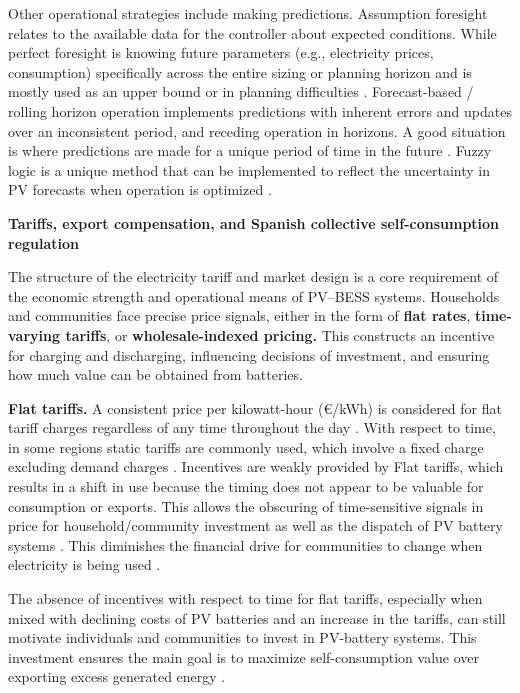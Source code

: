 Other operational strategies include making predictions. Assumption foresight relates to the available data for the controller about expected conditions. While perfect foresight is
knowing future parameters (e.g., electricity prices, consumption)
specifically across the entire sizing or planning horizon and is mostly
used as an upper bound or in planning difficulties \cite{ch2ref049}.
Forecast-based / rolling horizon operation implements predictions with
inherent errors and updates over an inconsistent period, and receding
operation in horizons. A good situation is where predictions are made
for a unique period of time in the future \cite{ch2ref049}. Fuzzy logic is a
unique method that can be implemented to reflect the uncertainty in PV
forecasts when operation is optimized \cite{ch2ref050}.


\noindent\textbf{Tariffs, export compensation, and Spanish collective
self-consumption regulation}\par

The structure of the electricity tariff and market design is a core
requirement of the economic strength and operational means of PV--BESS
systems. Households and communities face precise price signals, either
in the form of \textbf{flat rates}, \textbf{time-varying tariffs}, or
\textbf{wholesale-indexed pricing.} This constructs an incentive for
charging and discharging, influencing decisions of investment, and
ensuring how much value can be obtained from batteries.

\textbf{Flat tariffs.} A consistent price per kilowatt-hour (€/kWh) is
considered for flat tariff charges regardless of any time throughout the
day \cite{ch2ref053}. With respect to time, in some regions static tariffs are
commonly used, which involve a fixed charge excluding demand charges
\cite{ch2ref053}. Incentives are weakly provided by Flat tariffs, which results
in a shift in use because the timing does not appear to be valuable for
consumption or exports. This allows the obscuring of time-sensitive
signals in price for household/community investment as well as the
dispatch of PV battery systems \cite{ch2ref053}. This diminishes the financial
drive for communities to change when electricity is being used
\cite{ch2ref053}.

The absence of incentives with respect to time for flat tariffs,
especially when mixed with declining costs of PV batteries and an
increase in the tariffs, can still motivate individuals and communities
to invest in PV-battery systems. This investment ensures the main goal
is to maximize self-consumption value over exporting excess generated
energy \cite{ch2ref053}.

